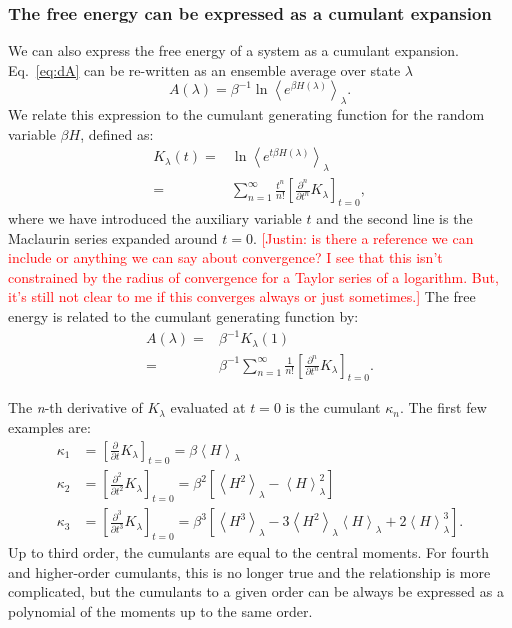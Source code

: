 \documentclass{article}
\newcommand{\warning}[1]{{\textsf{{\textcolor{red}{{[#1]}{}}}}}}
\begin{document}
\subsubsection{The free energy can be expressed as a cumulant expansion}

We can also express the free energy of a system as a cumulant expansion. Eq.~\ref{eq:dA} can be re-written as an ensemble average over state $\lambda$
\begin{equation}
 A(\lambda) =
	\beta^{-1} \ln \left\langle e^{\beta H(\lambda)} \right\rangle_\lambda.
\label{eq:avg_expr}
\end{equation}
We relate this expression to the cumulant generating function for the random variable $\beta H$, defined as:
\begin{align}
K_{\lambda}(t) =&
	\ln \left\langle 
    	e^{t \beta H(\lambda)}
    \right\rangle_\lambda \\
    =& 
    \sum_{n=1}^{\infty}
            	\frac{t^n}{n!}
                \left[ \frac{\partial^n}{\partial t^n} K_{\lambda}\right]_{t=0},
\end{align}
where we have introduced the auxiliary variable $t$ and the second line is the Maclaurin series expanded around $t=0$. 
\warning{Justin: is there a reference we can include or anything we can say about convergence? I see that this isn't constrained by the radius of convergence for a Taylor series of a logarithm. But, it's still not clear to me if this converges always or just sometimes.} 
The free energy is related to the cumulant generating function by:
\begin{align}
 A(\lambda) =& \beta^{-1} K_{\lambda}(1) \nonumber\\
                  =& \beta^{-1} \sum_{n=1}^{\infty}
            			\frac{1}{n!}\left[
                        	\frac{\partial^n}{\partial t^n} K_{\lambda}
                        \right]_{t=0}.
\label{eq:cumu_dA}
\end{align}

The \textit{n}-th derivative of $K_{\lambda}$ evaluated at $t=0$ is the cumulant $\kappa_n$. The first few examples are:
\begin{align}
\kappa_1 &=
	\left[\frac{\partial}{\partial t} K_{\lambda}\right]_{t=0} =
	\beta \left\langle H \right\rangle_\lambda \nonumber\\
\kappa_2 &=
	\left[\frac{\partial^2}{\partial t^2} K_{\lambda}\right]_{t=0} =
	\beta^2 \left[
		\left\langle H^2 \right\rangle_\lambda -
    	\left\langle H \right\rangle_\lambda^2
    \right] \nonumber\\
\kappa_3 &=
	\left[\frac{\partial^3}{\partial t^3} K_{\lambda} \right]_{t=0} =
	\beta^3 \left[
		\left\langle H^3 \right\rangle_\lambda -
    	3 \left\langle H^2 \right\rangle_\lambda
    		\left\langle H \right\rangle_\lambda +
    	2 \left\langle H \right\rangle_\lambda^3
    \right].
\label{eq:cumu}
\end{align}
Up to third order, the cumulants are equal to the central moments. For fourth and higher-order cumulants, this is no longer true and the relationship is more complicated, but the cumulants to a given order can be always be expressed as a polynomial of the moments up to the same order.
\end{document}
